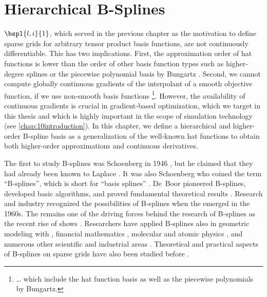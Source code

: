
\chapter{Hierarchical B-Splines}
\label{chap:30BSplines}

 $\bspl{l,i}{1}$,
which served in the previous chapter as the motivation
to define sparse grids for arbitrary tensor product basis functions,
are not continuously differentiable.
This has two implications.
First, the approximation order of hat functions
is lower than the order of other basis function types
such as higher-degree splines \cite{Sickel11Spline}
or the piecewise polynomial basis by Bungartz \cite{Bungartz98Finite}.
Second, we cannot compute globally continuous gradients of the
interpolant of a smooth objective function,
if we use non-smooth basis functions%
\footnote{%
  \dots{} which include the hat function basis as well as
  the piecewise polynomials by Bungartz.%
}.
However, the availability of continuous gradients is
crucial in gradient-based optimization,
which we target in this thesis and which is highly important in
the scope of simulation technology (see \cref{chap:10introduction}).
In this chapter, we define a hierarchical and
higher-order B-spline basis
as a generalization of the well-known hat functions
to obtain both higher-order approximations
and continuous derivatives.

The first to study B-splines was Schoenberg in 1946
\cite{Schoenberg46Contributions},
but he claimed that they had already been known to Laplace
\cite{Boor76Splines}.
It was also Schoenberg who coined the term ``B-splines'',
which is short for ``basis splines'' \cite{Schoenberg67Spline}.
De~Boor pioneered B-splines, developed basic algorithms, and
proved fundamental theoretical results \cite{Boor72Calculating}.
Research and industry recognized the possibilities of B-splines when
the \fem emerged in the 1960s.
The \fem remains one of the driving forces behind the research of
B-splines \cite{Hoellig03Finite} as the recent rise of \iga shows
.
Researchers have applied B-splines also in
geometric modeling with \nurbs
{},
financial mathematics \cite{Pflueger10Spatially},
molecular and atomic physics
,
and numerous other scientific and industrial areas
\cite{Valentin12Spline,Martin17WEB}.
Theoretical and practical aspects of B-splines on sparse grids
have also been studied before
.

